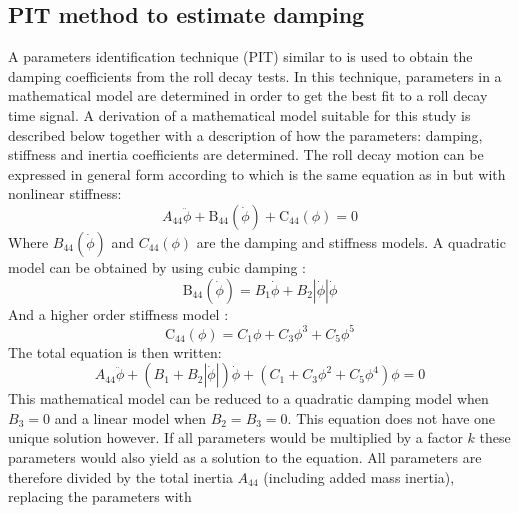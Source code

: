 \subsection*{PIT method to estimate
damping}\label{pit-method-to-estimate-damping}
\label{se:pit}
A parameters identification technique (PIT) similar to
\citep{7505983/EXYJELCU} is used to obtain the damping coefficients from
the roll decay tests. In this technique, parameters in a mathematical
model are determined in order to get the best fit to a roll decay time
signal. A derivation of a mathematical model suitable for this study is
described below together with a description of how the parameters:
damping, stiffness and inertia coefficients are determined. The roll
decay motion can be expressed in general form according to
\citep{7505983/KL7A3RIV} which is the same equation as in
\citep{7505983/FB64RGPF} but with nonlinear stiffness:
\begin{equation}
A_{44} \ddot{\phi} + \operatorname{B_{44}}\left(\dot{\phi}\right) + \operatorname{C_{44}}\left(\phi\right) = 0
\label{eq:roll_decay_equation_general_himeno}
\end{equation}
Where $B_{44}(\dot{\phi})$ and $C_{44}(\phi)$ are the damping and
stiffness models. A quadratic model can be obtained by using cubic
damping \citep{7505983/FB64RGPF}:
\begin{equation}
\operatorname{B_{44}}\left(\dot{\phi}\right) = B_{1} \dot{\phi} + B_{2} \left|{\dot{\phi}}\right| \dot{\phi}
\label{eq:b44_quadratic_equation}
\end{equation}
And a higher order stiffness model \citep{7505983/KL7A3RIV}:
\begin{equation}
\operatorname{C_{44}}\left(\phi\right) = C_{1} \phi + C_{3} \phi^{3} + C_{5} \phi^{5}
\label{eq:restoring_equation_cubic}
\end{equation}
The total equation is then written:
\begin{equation}
A_{44} \ddot{\phi} + \left(B_{1} + B_{2} \left|{\dot{\phi}}\right|\right) \dot{\phi} + \left(C_{1} + C_{3} \phi^{2} + C_{5} \phi^{4}\right) \phi = 0
\label{eq:roll_decay_equation_quadratic}
\end{equation}
This mathematical model can be reduced to a quadratic damping model when
$B_3=0$ and a linear model when $B_2=B_3=0$. This equation does not
have one unique solution however. If all parameters would be multiplied
by a factor $k$ these parameters would also yield as a solution to the
equation. All parameters are therefore divided by the total inertia
$A_{44}$ (including added mass inertia), replacing the parameters with
